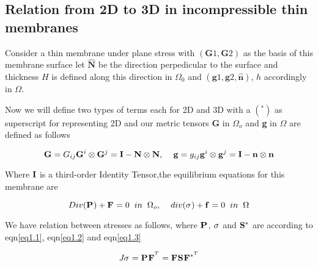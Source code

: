 \documentclass[12pt]{report}
\begin{document}
\pagebreak

\subsection{Relation from 2D to 3D in incompressible thin membranes}\label{2d3d}

Consider a thin membrane under plane stress with $({\textbf{G}}{1},{\textbf{G}}{2})$ as the basis of this membrane surface let $\hat{\textbf{N}}$ be the direction perpedicular to the surface and thickness $H$ is defined along this direction in $\Omega_{0}$ and $({\textbf{g}}{1},{\textbf{g}}{2},\hat{\textbf{n}})$, $h$ accordingly in $\Omega$.

\begin{flushleft}
Now we will define two types of terms each for 2D and 3D  with a $(^{*})$ as superscript for representing 2D and our metric tensors \textbf{G} in $\Omega_{o}$ and \textbf{g} in $\Omega$ are defined as follows
    
\begin{equation}\label{eq1.16}
    {\bf{G}} = G_{ij}{\bf{G}}^{i}\otimes {\bf{G}}^{j}= {\bf{I}}-{\bf{N}}\otimes {\bf{N}},\hspace{4mm}{\bf{g}} = g_{ij}{\bf{g}}^{i}\otimes {\bf{g}}^{j}={\bf{I}}-{\bf{n}}\otimes {\bf{n}}
\end{equation}    
    
Where ${\bf{I}}$ is a third-order Identity Tensor,the equilibrium equations for this membrane are 
   
\begin{equation}\label{eq1.17}
    Div({\bf{P}}^{}) + {\bf{F}}^{} = 0\hspace{2mm}in\hspace{2mm}\Omega_{o}, \hspace{4mm}div({\bf{\sigma}}^{}) + {\bf{f}}^{} = 0\hspace{2mm}in\hspace{2mm}\Omega
\end{equation}   
    
We have relation  between stresses  as follows, where ${\bf{P}}^{}$, ${\bf{\sigma}}^{}$ and ${\bf{S}}^{*}$ are according to eqn\ref{eq1.1}, eqn\ref{eq1.2} and eqn\ref{eq1.3}
  
\vspace{-8mm}
  
\begin{equation}\label{eq1.18}
    \textit{J}^{}{\bf{\sigma}}^{} =  {\bf{P}}^{}{\bf{F}}^{^{T}} = {\bf{F}}^{}{\bf{S}}^{}{\bf{F}}^{*^{T}}
\end{equation}


\end{flushleft}
\end{document}
